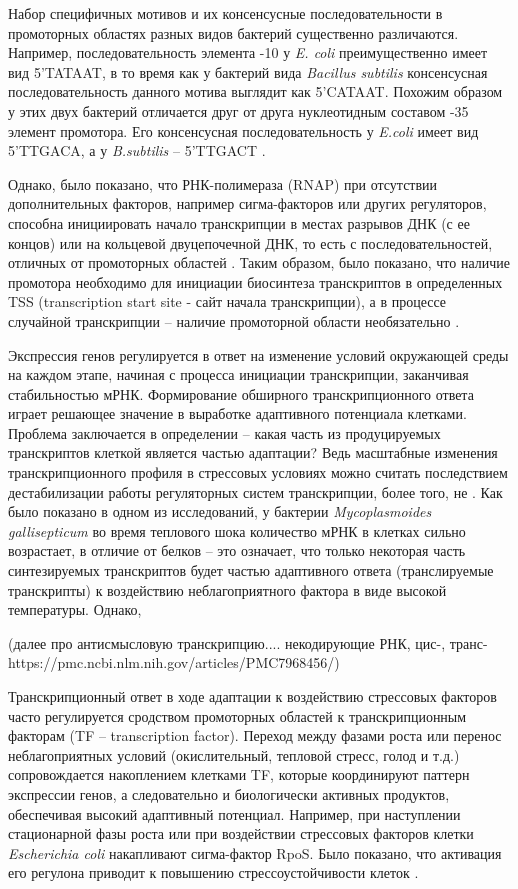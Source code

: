 \documentclass[14pt]{extreport}
\begin{document}
Набор специфичных мотивов и их консенсусные последовательности в промоторных областях разных видов бактерий существенно различаются. Например, последовательность элемента -10 у \textit{E. coli} преимущественно имеет вид 5'TATAAT, в то время как у бактерий вида \textit{Bacillus subtilis} консенсусная последовательность данного мотива выглядит как 5'CATAAT. Похожим образом у этих двух бактерий отличается друг от друга нуклеотидным составом -35 элемент промотора. Его консенсусная последовательность у \textit{E.coli} имеет вид 5'TTGACA, а у \textit{B.subtilis} -- 5'TTGACT \cite{lee1980nucleotide}.


Однако, было показано, что РНК-полимераза (RNAP) при отсутствии дополнительных факторов, например сигма-факторов или других регуляторов, способна инициировать начало транскрипции в местах разрывов ДНК (с ее концов) или на кольцевой двуцепочечной ДНК, то есть с последовательностей, отличных от промоторных областей \cite{vogt1969breaks, dausse1972interaction}. Таким образом, было показано, что наличие промотора необходимо для инициации биосинтеза транскриптов в определенных TSS (transcription start site - сайт начала транскрипции), а в процессе случайной транскрипции -- наличие промоторной области необязательно \cite{dausse1972interaction}. 




Экспрессия генов регулируется в ответ на изменение условий окружающей среды на каждом этапе, начиная с процесса инициации транскрипции, заканчивая стабильностью мРНК. Формирование обширного транскрипционного ответа играет решающее значение в выработке адаптивного потенциала клетками. Проблема заключается в определении -- какая часть из продуцируемых транскриптов клеткой является частью адаптации? Ведь масштабные изменения транскрипционного профиля в стрессовых условиях можно считать последствием дестабилизации работы регуляторных систем транскрипции, более того, не . Как было показано в одном из исследований, у бактерии \textit{Mycoplasmoides gallisepticum} \cite{mazin2014transcriptome} во время теплового шока количество мРНК в клетках сильно возрастает, в отличие от белков -- это означает, что только некоторая часть синтезируемых транскриптов будет частью адаптивного ответа (транслируемые транскрипты) к воздействию неблагоприятного фактора в виде высокой температуры. Однако, 


(далее про антисмысловую транскрипцию.... некодирующие РНК, цис-, транс- https://pmc.ncbi.nlm.nih.gov/articles/PMC7968456/)

Транскрипционный ответ в ходе адаптации к воздействию стрессовых факторов часто регулируется сродством промоторных областей к транскрипционным факторам (TF -- transcription factor). Переход между фазами роста или перенос неблагоприятных условий (окислительный, тепловой стресс, голод и т.д.) сопровождается накоплением клетками TF, которые координируют паттерн экспрессии генов, а следовательно и биологически активных продуктов, обеспечивая высокий адаптивный потенциал. Например, при наступлении стационарной фазы роста или при воздействии стрессовых факторов клетки \textit{Escherichia coli} накапливают сигма-фактор RpoS. Было показано, что активация его регулона приводит к повышению стрессоустойчивости клеток \cite{tanaka1993heterogeneity}.
\end{document}
